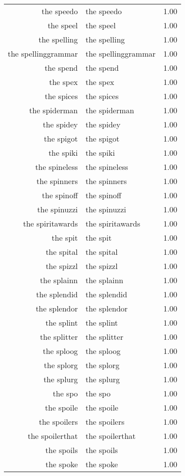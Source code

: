 \begin{table}[ht]
\begin{tabular}{rlr}
  the speedo & the speedo & 1.00 \\ 
  the speel & the speel & 1.00 \\ 
  the spelling & the spelling & 1.00 \\ 
  the spellinggrammar & the spellinggrammar & 1.00 \\ 
  the spend & the spend & 1.00 \\ 
  the spex & the spex & 1.00 \\ 
  the spices & the spices & 1.00 \\ 
  the spiderman & the spiderman & 1.00 \\ 
  the spidey & the spidey & 1.00 \\ 
  the spigot & the spigot & 1.00 \\ 
  the spiki & the spiki & 1.00 \\ 
  the spineless & the spineless & 1.00 \\ 
  the spinners & the spinners & 1.00 \\ 
  the spinoff & the spinoff & 1.00 \\ 
  the spinuzzi & the spinuzzi & 1.00 \\ 
  the spiritawards & the spiritawards & 1.00 \\ 
  the spit & the spit & 1.00 \\ 
  the spital & the spital & 1.00 \\ 
  the spizzl & the spizzl & 1.00 \\ 
  the splainn & the splainn & 1.00 \\ 
  the splendid & the splendid & 1.00 \\ 
  the splendor & the splendor & 1.00 \\ 
  the splint & the splint & 1.00 \\ 
  the splitter & the splitter & 1.00 \\ 
  the sploog & the sploog & 1.00 \\ 
  the splorg & the splorg & 1.00 \\ 
  the splurg & the splurg & 1.00 \\ 
  the spo & the spo & 1.00 \\ 
  the spoile & the spoile & 1.00 \\ 
  the spoilers & the spoilers & 1.00 \\ 
  the spoilerthat & the spoilerthat & 1.00 \\ 
  the spoils & the spoils & 1.00 \\ 
  the spoke & the spoke & 1.00 \\ 

\end{tabular}
\end{table}
